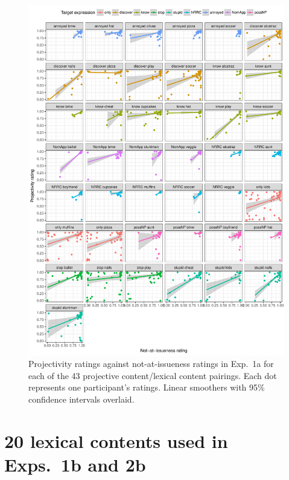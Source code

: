\documentclass[11pt,fleqn]{article}
\newcommand{\6}{\mbox{$[\hspace*{-.6mm}[$}}
\newcommand{\9}{\mbox{$]\hspace*{-.6mm}]$}}
\begin{document}
\begin{figure}[!h]
\begin{center}

\includegraphics[width=.93\textwidth]{../results/exp1a/graphs/subject-variability-aiproj-exp1a}

\end{center}
\caption{Projectivity ratings against not-at-issueness ratings in Exp.~1a for each of the 43 projective content/lexical content pairings. Each dot represents one participant's ratings. Linear smoothers with 95\% confidence intervals overlaid.}
\label{f-corr}
\end{figure}

\section{20 lexical contents used in Exps.~1b and 2b}\label{a-lexcontents1b}
\end{document}

